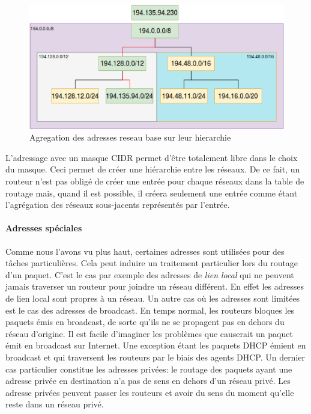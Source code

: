 \begin{figure}
\centering
\includegraphics[width=15cm]{./pics/routagecidr.eps}
\caption{Agregation des adresses reseau base sur leur hierarchie}
\label{fig:routcidr}
\end{figure}

L'adressage avec un masque CIDR permet d'être totalement libre dans le choix du
masque. Ceci permet de créer une hiérarchie entre les réseaux. De ce fait,
un routeur n'est pas obligé de créer une entrée pour chaque réseaux dans la
table de routage mais, quand il est possible, il créera seulement une entrée
comme étant l'agrégation des réseaux sous-jacents représentés par l'entrée.



\paragraph{Adresses spéciales}


Comme nous l'avons vu plus haut, certaines adresses sont utilisées pour des
tâches particulières. Cela peut induire un traitement particulier lors du routage
d'un paquet.  C'est le cas par exemple des adresses de {\it lien local} qui ne
peuvent jamais traverser un routeur pour joindre un réseau différent. En effet
les adresses de lien local sont propres à un réseau.
Un autre cas où les adresses sont limitées est le cas des adresses de broadcast.
En temps normal, les routeurs bloques les paquets émis en broadcast, de sorte qu'ils ne se propagent pas en dehors du réseau d'origine. Il est facile d'imaginer les problèmes que causerait un paquet émit en broadcast sur Internet. Une exception étant les paquets DHCP émient en broadcast et qui traversent les routeurs par le biais des agents DHCP.
Un dernier cas particulier constitue les adresses privées: le routage des paquets ayant une adresse privée en destination n'a pas de sens en dehors d'un réseau privé. Les adresse privées peuvent passer les routeurs et avoir du sens du moment qu'elle reste dans un réseau privé.

